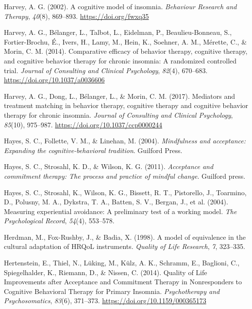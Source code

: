 \documentclass[
  ,doc,11pt, twoside,floatsintext]{apa6}
\newlength{\cslhangindent}
\newlength{\cslentryspacingunit} %
\newenvironment{CSLReferences}[2] %
 {%
  \setlength{\parindent}{0pt}
  \ifodd #1
  \let\oldpar\par
  \def\par{\hangindent=\cslhangindent\oldpar}
  \fi
  \setlength{\parskip}{#2\cslentryspacingunit}
 }%
 {}
\begin{document}
\begin{CSLReferences}{1}{0}
\leavevmode{}%
Harvey, A. G. (2002). A cognitive model of insomnia. \emph{Behaviour Research and Therapy}, \emph{40}(8), 869--893. \url{https://doi.org/fwxq35}

\leavevmode{}%
Harvey, A. G., Bélanger, L., Talbot, L., Eidelman, P., Beaulieu-Bonneau, S., Fortier-Brochu, É., Ivers, H., Lamy, M., Hein, K., Soehner, A. M., Mérette, C., \& Morin, C. M. (2014). Comparative efficacy of behavior therapy, cognitive therapy, and cognitive behavior therapy for chronic insomnia: A randomized controlled trial. \emph{Journal of Consulting and Clinical Psychology}, \emph{82}(4), 670--683. \url{https://doi.org/10.1037/a0036606}

\leavevmode{}%
Harvey, A. G., Dong, L., Bélanger, L., \& Morin, C. M. (2017). Mediators and treatment matching in behavior therapy, cognitive therapy and cognitive behavior therapy for chronic insomnia. \emph{Journal of Consulting and Clinical Psychology}, \emph{85}(10), 975--987. \url{https://doi.org/10.1037/ccp0000244}

\leavevmode{}%
Hayes, S. C., Follette, V. M., \& Linehan, M. (2004). \emph{Mindfulness and acceptance: Expanding the cognitive-behavioral tradition}. Guilford Press.

\leavevmode{}%
Hayes, S. C., Strosahl, K. D., \& Wilson, K. G. (2011). \emph{Acceptance and commitment therapy: The process and practice of mindful change}. Guilford press.

\leavevmode{}%
Hayes, S. C., Strosahl, K., Wilson, K. G., Bissett, R. T., Pistorello, J., Toarmino, D., Polusny, M. A., Dykstra, T. A., Batten, S. V., Bergan, J., et al. (2004). Measuring experiential avoidance: A preliminary test of a working model. \emph{The Psychological Record}, \emph{54}(4), 553--578.

\leavevmode{}%
Herdman, M., Fox-Rushby, J., \& Badia, X. (1998). A model of equivalence in the cultural adaptation of {HRQoL} instruments. \emph{Quality of Life Research}, \emph{7}, 323--335.

\leavevmode{}%
Hertenstein, E., Thiel, N., Lüking, M., Külz, A. K., Schramm, E., Baglioni, C., Spiegelhalder, K., Riemann, D., \& Nissen, C. (2014). Quality of {Life Improvements} after {Acceptance} and {Commitment Therapy} in {Nonresponders} to {Cognitive Behavioral Therapy} for {Primary Insomnia}. \emph{Psychotherapy and Psychosomatics}, \emph{83}(6), 371--373. \url{https://doi.org/10.1159/000365173}


\end{CSLReferences}
\end{document}
